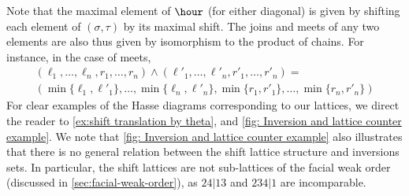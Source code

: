 Note that the maximal element of $\hour$ (for either diagonal) is given by shifting each element of $(\sigma,\tau)$ by its maximal shift.
The joins and meets of any two elements are also thus given by isomorphism to the product of chains.
For instance, in the case of meets,
\begin{multline*}
	(\ell_1,\ldots,\ell_n,r_1,\ldots,r_n)\land (\ell'_1,\ldots,\ell'_n,r'_1,\ldots,r'_n) = \\ (\min\{\ell_1,\ell'_1\},\ldots,\min\{\ell_n,\ell'_n\},\min\{r_1,r'_1\},\ldots,\min\{r_n,r'_n\})
\end{multline*}
For clear examples of the Hasse diagrams corresponding to our lattices, we direct the reader to \cref{ex:shift translation by theta}, and \cref{fig: Inversion and lattice counter example}.
We note that \cref{fig: Inversion and lattice counter example} also illustrates that there is no general relation between the shift lattice structure and inversions sets.
In particular, the shift lattices are not sub-lattices of the facial weak order (discussed in \cref{sec:facial-weak-order}), as $24|13$ and $234|1$ are incomparable.

